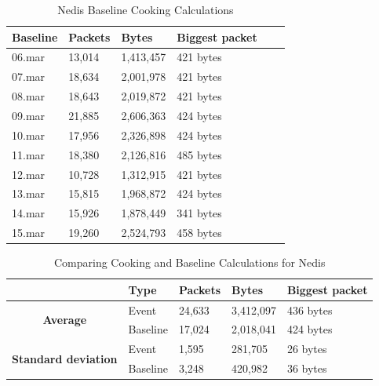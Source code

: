 \begin{table}[H]
    \centering
    \caption{Nedis Baseline Cooking Calculations}
    \begin{tabular}{|l|l|l|l|l|l|}
    \hline
        \textbf{Baseline} & \textbf{Packets} & \textbf{Bytes} & \textbf{Biggest packet} \\ \hline
        06.mar & 13,014 & 1,413,457 & 421 bytes \\ \hline
        07.mar & 18,634 & 2,001,978 & 421 bytes \\ \hline
        08.mar & 18,643 & 2,019,872 & 421 bytes \\ \hline
        09.mar & 21,885 & 2,606,363 & 424 bytes \\ \hline
        10.mar & 17,956 & 2,326,898 & 424 bytes \\ \hline
        11.mar & 18,380 & 2,126,816 & 485 bytes \\ \hline
        12.mar & 10,728 & 1,312,915 & 421 bytes \\ \hline
        13.mar & 15,815 & 1,968,872 & 424 bytes \\ \hline
        14.mar & 15,926 & 1,878,449 & 341 bytes \\ \hline
        15.mar & 19,260 & 2,524,793 & 458 bytes \\ \hline
    \end{tabular}
    \label{tab:NedisBaselineCookingCalculations}
\end{table}

\begin{table}[H]
    \centering
    \caption{Comparing Cooking and Baseline Calculations for Nedis}
    \begin{tabular}{c|l|l|l|l|}
        \cline{2-5}
        \multicolumn{1}{l|}{}                                              & \textbf{Type} & \textbf{Packets} & \textbf{Bytes} & \textbf{Biggest packet} \\ \hline
        \multicolumn{1}{|c|}{\multirow{2}{*}{\textbf{Average}}}            & Event         & 24,633             & 3,412,097       & 436 bytes               \\ \cline{2-5} 
        \multicolumn{1}{|c|}{}                                             & Baseline      & 17,024             & 2,018,041       & 424 bytes                \\ \hline
        \multicolumn{1}{|c|}{\multirow{2}{*}{\textbf{Standard deviation}}} & Event         & 1,595              & 281,705         & 26 bytes                 \\ \cline{2-5} 
        \multicolumn{1}{|c|}{}                                             & Baseline      & 3,248              & 420,982         & 36 bytes               \\ \hline          
    \end{tabular}
    \label{tab:NedisComparingBaselineAndCookingCalculations}
\end{table}

